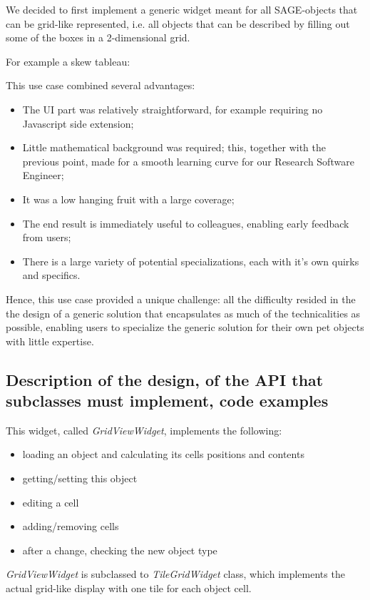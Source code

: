 \documentclass{deliverablereport}
\begin{document}
We decided to first implement a generic widget meant for all SAGE-objects that can
be grid-like represented, i.e. all objects that can be described by
filling out some of the boxes in a 2-dimensional grid.

For example a skew tableau:

This use case combined several advantages:
\begin{itemize}
\item The UI part was relatively straightforward, for example
  requiring no Javascript side extension;
\item Little mathematical background was required; this, together with
  the previous point, made for a smooth learning curve for our
  Research Software Engineer;
\item It was a low hanging fruit with a large coverage;
\item The end result is immediately useful to colleagues, enabling
  early feedback from users;
\item There is a large variety of potential specializations, each with
  it's own quirks and specifics.
\end{itemize}
Hence, this use case provided a unique challenge: all the difficulty
resided in the the design of a generic solution that encapsulates as
much of the technicalities as possible, enabling users to specialize
the generic solution for their own pet objects with little expertise.

\subsection{Description of the design, of the API that subclasses must
  implement, code examples}

This widget, called \emph{GridViewWidget}, implements the following:

\begin{itemize}
 \item loading an object and calculating its cells positions and
   contents
 \item getting/setting this object
 \item editing a cell
 \item adding/removing cells
 \item after a change, checking the new object type
\end{itemize}

\emph{GridViewWidget} is subclassed to \emph{TileGridWidget} class,
which implements the actual grid-like display with one tile for each
object cell.
\end{document}
